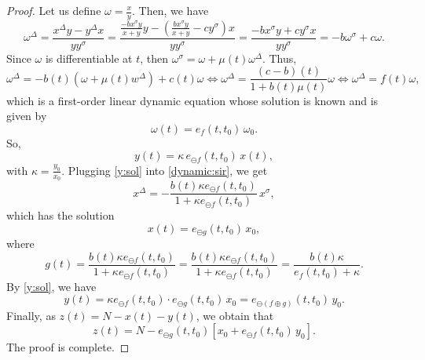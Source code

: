 \documentclass[pdflatex,sn-mathphys-num]{sn-jnl}
\theoremstyle{remark}
\begin{document}
\begin{proof}
Let us define $\omega = \frac{x}{y}$. Then, we have
$$
\omega^\Delta = \frac{x^\Delta y - y^\Delta x}{yy^\sigma}
= \frac{\frac{-bx^\sigma y}{x + y}y - \left(\frac{bx^\sigma y}{x+y} 
- cy^\sigma\right)x}{yy^\sigma}
= \frac{-bx^\sigma y + cy^\sigma x}{yy^\sigma}
= -b\omega^\sigma + c\omega.
$$
Since $\omega$ is differentiable at $t$, then 
$\omega^\sigma = \omega + \mu(t) \omega^\Delta$. Thus, 
$$
\omega^\Delta = -b(t)(\omega + \mu(t)w^\Delta) + c(t)\omega 
\Leftrightarrow \omega^\Delta = \frac{(c-b)(t)}{1 + b(t)\mu(t)}\omega
\Leftrightarrow \omega^\Delta = f(t) \omega, 
$$
which is a first-order linear dynamic equation whose solution is known
and is given by
$$
\omega(t) = e_{f}(t,t_0)\,\omega_0. 
$$
So, 
\begin{equation}
\label{y:sol}
y(t) = \kappa\, e_{\ominus f}(t,t_0)\,x(t),
\end{equation}
with $\kappa = \frac{y_0}{x_0}$. 
Plugging \eqref{y:sol} into \eqref{dynamic:sir}, we get
$$
x^\Delta = -\frac{b(t)\kappa e_{\ominus f}(t,t_0)}
{1 + \kappa e_{\ominus f}(t,t_0)}\,x^\sigma,
$$
which has the solution
$$
x(t) = e_{\ominus g}(t,t_0)\,x_0,
$$
where 
$$
g(t)= \frac{b(t)\kappa e_{\ominus f}(t,t_0)}
{1 + \kappa e_{\ominus f}(t,t_0)}
= \frac{b(t)\kappa e_{\ominus f}(t,t_0)}{1 + \kappa e_{\ominus f}(t,t_0)}
= \frac{b(t)\kappa}{e_f(t,t_0) + \kappa}.
$$
By \eqref{y:sol}, we have 
$$
y(t) = \kappa e_{\ominus f}(t,t_0)\cdot
e_{\ominus g}(t,t_0)\, x_0 = e_{\ominus(f \oplus g)}(t,t_0)\,y_0.
$$
Finally, as $z(t) = N - x(t) - y(t)$, we obtain that
$$
z(t) = N - e_{\ominus g}(t,t_0)\left[x_0 + e_{\ominus f}(t,t_0)\,y_0\right].
$$
The proof is complete. 
\end{proof}
\end{document}
